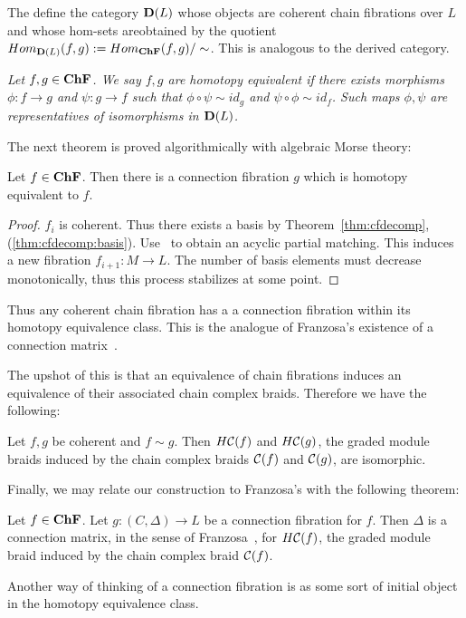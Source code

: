 The define the category ${\bf D}(L)$ whose objects are coherent chain fibrations over $L$ and whose hom-sets areobtained by the quotient $Hom_{{\bf D}(L)}(f,g) := Hom_{{\bf ChF}}(f,g)/\sim$.  This is analogous to the derived category.

\begin{defn}
{\em
Let $f,g\in {\bf ChF}$.  We say $f,g$ are {\em homotopy equivalent} if there exists morphisms $\phi:f\to g$ and $\psi:g\to f$ such that $\phi\circ \psi\sim id_g$ and $\psi\circ \phi \sim id_f$. Such maps $\phi,\psi$ are representatives of isomorphisms in ${\bf D}(L)$.
}
\end{defn}

The next theorem is proved algorithmically with algebraic Morse theory:


\begin{thm}\label{thm:exist}
Let $f\in {\bf ChF}$.  Then there is a connection fibration $g$ which is homotopy equivalent to $f$.
\end{thm}
\begin{proof}
$f_i$ is coherent.  Thus there exists a basis by Theorem~\ref{thm:cfdecomp}, (\ref{thm:cfdecomp:basis}).  Use~\cite[Algorithm 3.6]{focm} to obtain an acyclic partial matching.  This induces a new fibration $f_{i+1}:M\to L$.  The number of basis elements must decrease monotonically, thus this process stabilizes at some point.

\end{proof}


\begin{rem}
Thus any coherent chain fibration has a a connection fibration within its homotopy equivalence class.  This is the analogue of Franzosa's existence of a connection matrix~\cite{fran}.
\end{rem}


The upshot of this is that an equivalence of chain fibrations induces an equivalence of their associated chain complex braids.  Therefore we have the following:

\begin{prop}
Let $f,g$ be coherent and $f\sim g$. Then $H{\mathcal C}(f)$ and $H{\mathcal C}(g)$, the graded module braids induced by the chain complex braids ${\mathcal C}(f)$ and ${\mathcal C}(g)$, are isomorphic.
\end{prop}

Finally, we may relate our construction to Franzosa's with the following theorem:

\begin{thm}\label{thm:cfcm}
Let $f\in {\bf ChF}$.  Let $g:(C,\Delta)\to L$ be a connection fibration for $f$.  Then $\Delta$ is a connection matrix, in the sense of Franzosa~\cite[Definition 3.6]{fran}, for $H{\mathcal C}(f)$, the graded module braid induced by the chain complex braid ${\mathcal C}(f)$.
\end{thm}


Another way of thinking of a connection fibration is as some sort of initial object in the homotopy equivalence class.


